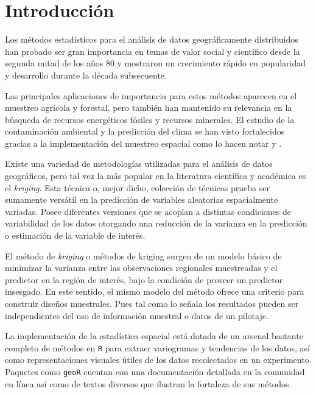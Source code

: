 \documentclass[14pt]{extarticle}
\begin{document}
\newpage
\section*{Introducción}

Los métodos estadísticos para el análisis de datos geográficamente distribuidos han probado ser gran importancia en temas de valor social y científico desde la segunda mitad de los años 80 y mostraron un crecimiento rápido en popularidad y desarrollo durante la década subsecuente. 

Las principales aplicaciones de importancia para estos métodos aparecen en el muestreo agrícola y forestal, pero también han mantenido su relevancia en la búsqueda de recursos energéticos fósiles y recursos minerales. El estudio de la contaminación ambiental y la predicción del clima se han visto fortalecidos gracias a la implementación del muestreo espacial como lo hacen notar \cite{Alinghaus.1996} y \cite{Hohn.1993}. 

Existe una variedad de metodologías utilizadas para el análisis de datos geográficos, pero tal vez la más popular en la literatura científica y académica es el \textit{kriging}. Esta técnica o, mejor dicho, colección de técnicas prueba ser sumamente versátil en la predicción de variables aleatorias espacialmente variadas. Posee diferentes versiones que se acoplan a distintas condiciones de variabilidad de los datos otorgando una reducción de la varianza en la predicción o estimación de la variable de interés. 

El método de \textit{kriging} o métodos de kriging surgen de un modelo básico de minimizar la varianza entre las observaciones regionales muestreadas y el predictor en la región de interés, bajo la condición de proveer un predictor insesgado. En este sentido, el mismo modelo del método ofrece una criterio para construir diseños muestrales. Pues tal como lo señala \cite{Cressie.1986} los resultados pueden ser independientes del uso de información muestral o datos de un pilotaje. 

La implementación de la estadística espacial está dotada de un arsenal bastante completo de métodos en \verb|R| para extraer variogramas y tendencias de los datos, así como representaciones visuales útiles de los datos recolectados en un experimento. Paquetes como \verb|geoR| cuentan con una documentación detallada en la comunidad en línea así como de textos diversos que ilustran la fortaleza de sus métodos. 
\end{document}
